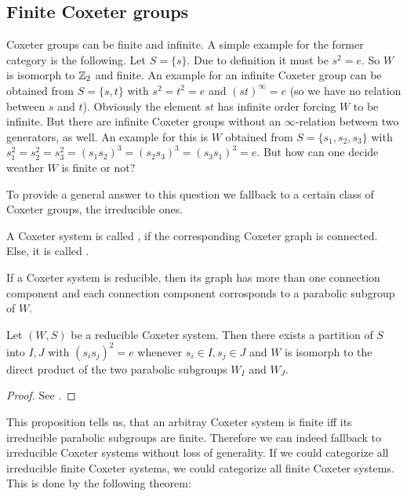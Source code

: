 \subsection{Finite Coxeter groups}
\label{sec:coxeter-groups-finite}

Coxeter groups can be finite and infinite. A simple example for the former category is the following. Let $S = \{ s \}$. Due to definition it must be $s^2 = e$. So $W$ is isomorph to $\mathbb{Z}_2$ and finite. An example for an infinite Coxeter group can be obtained from $S = \{s,t\}$ with $s^2=t^2=e$ and $(st)^\infty = e$ (so we have no relation between $s$ and $t$). Obviously the element $st$ has infinite order forcing $W$ to be infinite. But there are infinite Coxeter groups without an $\infty$-relation between two generators, as well. An example for this is $W$ obtained from $S=\{s_1,s_2,s_3\}$ with $s_1^2=s_2^2=s_3^2=(s_1 s_2)^3=(s_2 s_3)^3=(s_3 s_1)^3=e$. But how can one decide weather $W$ is finite or not?

To provide a general answer to this question we fallback to a certain class of Coxeter groups, the irreducible ones.

\begin{defi}
	A Coxeter system is called , if the corresponding Coxeter graph is connected. Else, it is called .
\end{defi}

If a Coxeter system is reducible, then its graph has more than one connection component and each connection component corrosponds to a parabolic subgroup of $W$. 

\begin{prop}
	Let $(W,S)$ be a reducible Coxeter system. Then there exists a partition of $S$ into $I,J$ with $(s_i s_j)^2 = e$ whenever $s_i \in I, s_j \in J$ and $W$ is isomorph to the direct product of the two parabolic subgroups $W_I$ and $W_J$.

	\begin{proof}
		See \cite[Proposition 6.1]{humphreys:coxeter}.
	\end{proof}
\end{prop}

This proposition tells us, that an arbitray Coxeter system is finite iff its irreducible parabolic subgroups are finite. Therefore we can indeed fallback to irreducible Coxeter systems without loss of generality. If we could categorize all irreducible finite Coxeter systems, we could categorize all finite Coxeter systems. This is done by the following theorem:

